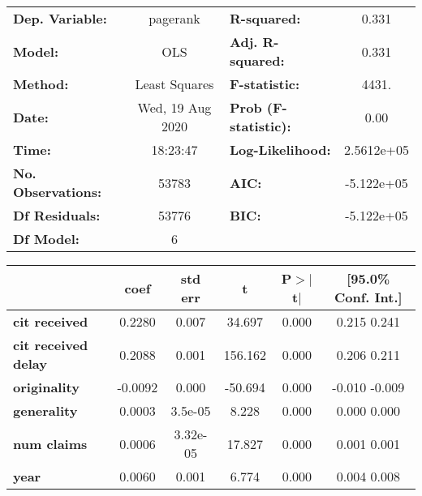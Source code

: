 \begin{center}
\begin{tabular}{lclc}
\toprule
\textbf{Dep. Variable:}     &     pagerank     & \textbf{  R-squared:         } &       0.331    \\
\textbf{Model:}             &       OLS        & \textbf{  Adj. R-squared:    } &       0.331    \\
\textbf{Method:}            &  Least Squares   & \textbf{  F-statistic:       } &       4431.    \\
\textbf{Date:}              & Wed, 19 Aug 2020 & \textbf{  Prob (F-statistic):} &       0.00     \\
\textbf{Time:}              &     18:23:47     & \textbf{  Log-Likelihood:    } &   2.5612e+05   \\
\textbf{No. Observations:}  &       53783      & \textbf{  AIC:               } &   -5.122e+05   \\
\textbf{Df Residuals:}      &       53776      & \textbf{  BIC:               } &   -5.122e+05   \\
\textbf{Df Model:}          &           6      & \textbf{                     } &                \\
\bottomrule
\end{tabular}
\begin{tabular}{lccccc}
                            & \textbf{coef} & \textbf{std err} & \textbf{t} & \textbf{P$>$$|$t$|$} & \textbf{[95.0\% Conf. Int.]}  \\
\midrule
\textbf{cit received}       &       0.2280  &        0.007     &    34.697  &         0.000        &         0.215     0.241       \\
\textbf{cit received delay} &       0.2088  &        0.001     &   156.162  &         0.000        &         0.206     0.211       \\
\textbf{originality}        &      -0.0092  &        0.000     &   -50.694  &         0.000        &        -0.010    -0.009       \\
\textbf{generality}         &       0.0003  &      3.5e-05     &     8.228  &         0.000        &         0.000     0.000       \\
\textbf{num claims}         &       0.0006  &     3.32e-05     &    17.827  &         0.000        &         0.001     0.001       \\
\textbf{year}               &       0.0060  &        0.001     &     6.774  &         0.000        &         0.004     0.008       \\

\end{tabular}
\end{center}
